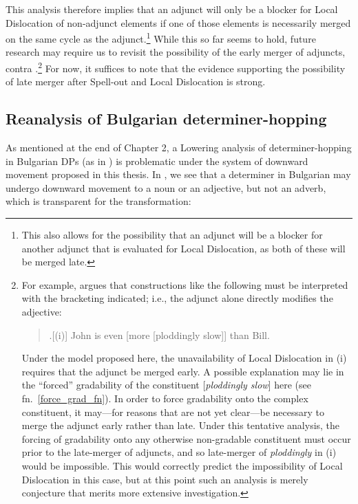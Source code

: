 This analysis therefore implies that an adjunct will only be a blocker for Local Dislocation of non-adjunct elements if one of those elements is necessarily merged on the same cycle as the adjunct.\footnote{This also allows for the possibility that an adjunct will be a blocker for another adjunct that is evaluated for Local Dislocation, as both of these will be merged late.} While this so far seems to hold, future research may require us to revisit the possibility of the early merger of adjuncts, contra \citet{stepanov2000}.\footnote{For example, \citet{embick2007} argues that constructions like the following must be interpreted with the bracketing indicated; i.e., the adjunct alone directly modifies the adjective:

\begin{quote}
\ex.[(i)] John is even [more [ploddingly slow]] than Bill.

\end{quote}
Under the model proposed here, the unavailability of Local Dislocation in (i) requires that the adjunct be merged early. A possible explanation may lie in the ``forced'' gradability of the constituent [{\it ploddingly slow}] here (see fn.\ \ref{force_grad_fn}). In order to force gradability onto the complex constituent, it may---for reasons that are not yet clear---be necessary to merge the adjunct early rather than late. Under this tentative analysis, the forcing of gradability onto any otherwise non-gradable constituent must occur prior to the late-merger of adjuncts, and so late-merger of {\it ploddingly} in (i) would be impossible. This would correctly predict the impossibility of Local Dislocation in this case, but at this point such an analysis is merely conjecture that merits more extensive investigation.} For now, it suffices to note that the evidence supporting the possibility of late merger after Spell-out and Local Dislocation is strong.

\subsection{Reanalysis of Bulgarian determiner-hopping}\label{bulg_det_reanal_sec}
As mentioned at the end of Chapter 2, a Lowering analysis of determiner-hopping in Bulgarian DPs (as in ) is problematic under the system of downward movement proposed in this thesis. In \Next, we see that a determiner in Bulgarian may undergo downward movement to a noun or an adjective, but not an adverb, which is transparent for the transformation:

